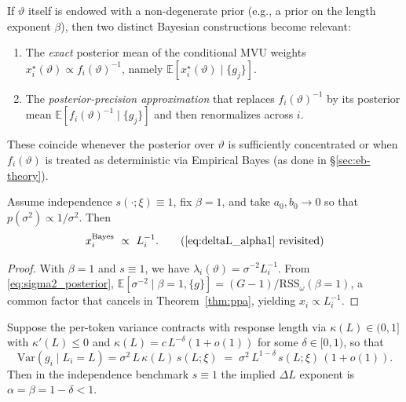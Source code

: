 \begin{remark}
If $\vartheta$ itself is endowed with a non-degenerate prior (e.g., a prior on the length exponent $\beta$),
then two distinct Bayesian constructions become relevant:
\begin{enumerate}
\item The \emph{exact} posterior mean of the conditional MVU weights
$x_i^\star(\vartheta)\propto f_i(\vartheta)^{-1}$, namely
$\mathbb{E}[x_i^\star(\vartheta)\mid\{g_j\}]$.
\item The \emph{posterior-precision approximation} that replaces $f_i(\vartheta)^{-1}$ by its posterior mean
$\mathbb{E}[f_i(\vartheta)^{-1}\mid\{g_j\}]$ and then renormalizes across $i$.
\end{enumerate}
These coincide whenever the posterior over $\vartheta$ is sufficiently concentrated or when $f_i(\vartheta)$
is treated as deterministic via Empirical Bayes (as done in \S\ref{sec:eb-theory}).
\end{remark}

\begin{theorem}[Jeffreys’ baseline recovers $\Delta L$ with $\alpha=1$]\label{thm:jeffreys}
Assume independence $s(\cdot;\xi)\equiv 1$, fix $\beta=1$, and take $a_0,b_0\to 0$ so that $p(\sigma^2)\propto 1/\sigma^2$. Then
\begin{equation}
  x_i^{\mathrm{Bayes}} \ \propto\ L_i^{-1}.
  \tag{\ref{eq:deltaL_alpha1} revisited}
\end{equation}
\end{theorem}

\begin{proof}
With $\beta=1$ and $s\equiv 1$, we have $\lambda_i(\vartheta)=\sigma^{-2} L_i^{-1}$. From \eqref{eq:sigma2_posterior}, $\mathbb{E}[\sigma^{-2}\mid \beta{=}1,\{g\}]=(G-1)/\mathrm{RSS}_\omega(\beta{=}1)$, a common factor that cancels in Theorem~\ref{thm:ppa}, yielding $x_i\propto L_i^{-1}$.
\end{proof}

\begin{proposition}\label{prop:alpha-less-than-1}
Suppose the per-token variance contracts with response length via $\kappa(L)\in(0,1]$ with $\kappa'(L)\le 0$ and
\(
\kappa(L)=c\,L^{-\delta}(1+o(1))
\)
for some $\delta\in[0,1)$, so that
\begin{equation}
  \mathrm{Var}(g_i\mid L_i=L)=\sigma^2\,L\,\kappa(L)\,s(L;\xi)
  \;=\;
  \sigma^2\,L^{1-\delta}\,s(L;\xi)\,(1+o(1)).
  \label{eq:effective-length-law_repeat}
\end{equation}
Then in the independence benchmark $s\equiv 1$ the implied $\Delta L$ exponent is
\(
\alpha=\beta=1-\delta<1.
\)
\end{proposition}

